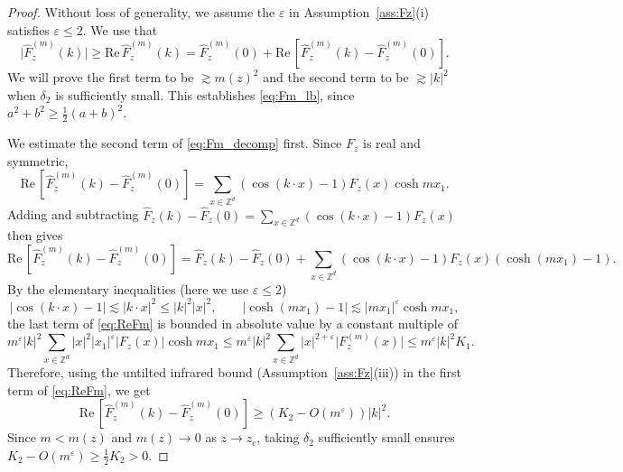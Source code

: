 \documentclass[11pt,hidelinks]{article}
\theoremstyle{plain}
\numberwithin{equation}{section}
\newcommand{\eps}{\varepsilon}
\newcommand{\Z}{\mathbb{Z}}
\renewcommand{\(}{\left(}
\renewcommand{\)}{\right)}
\newcommand{\half}{\frac{1}{2}}
\newcommand{\1}{\mathds{1}}
\renewcommand{\Re}{\mathrm{Re}\,}
\providecommand{\abs}[1]{\lvert#1\rvert}
\newcommand{\mz}{m(z)}
\newcommand{\supm}{^{(m)}}
\begin{document}
\begin{proof}
Without loss of generality, we assume the $\eps$ in Assumption~\ref{ass:Fz}(i) satisfies $\eps \le 2$. 
We use that
\begin{equation}
\label{eq:Fm_decomp}
\abs{ \hat F_z\supm (k) }
\ge \Re \hat F_z\supm (k)
= \hat F_z\supm(0) + \Re [ \hat F_z\supm(k) - \hat F_z\supm (0) ]. 
\end{equation}
We will prove the first term to be $\gtrsim \mz^2$ and the second term to be $\gtrsim \abs k^2$ when $\delta_2$ is sufficiently small. This establishes \eqref{eq:Fm_lb}, since $a^2 + b^2 \ge \half (a + b)^2$. 

We estimate the second term of \eqref{eq:Fm_decomp} first. 
Since $F_z$ is real and symmetric, 
\begin{equation}
\Re [ \hat F_z\supm(k) - \hat F_z\supm (0) ]
=  \sum_{x\in \Z^d} ( \cos (k\cdot x) - 1) F_z(x) \cosh mx_1.
\end{equation}
Adding and subtracting 
$\hat F_z(k) - \hat F_z(0) =  \sum_{x\in \Z^d} ( \cos (k\cdot x) - 1 ) F_z(x)$
then gives
\begin{equation}
\label{eq:ReFm}
\Re [ \hat F_z\supm(k) - \hat F_z\supm (0) ]
= \hat F_z(k) - \hat F_z(0) + \sum_{x\in \Z^d} ( \cos (k\cdot x) - 1 ) F_z(x) (\cosh (mx_1) - 1). 
\end{equation}
By the elementary inequalities (here we use $\eps\le 2$)
\begin{equation}
\label{eq:cosh1}
\abs{  \cos (k\cdot x) - 1 } \lesssim \abs{ k\cdot x }^2 \le \abs k^2 \abs x^2,
\qquad
\abs{ \cosh (mx_1) - 1 } \lesssim \abs{ mx_1}^\eps \cosh mx_1, 
\end{equation}
the last term of \eqref{eq:ReFm} is bounded in absolute value by a constant multiple of
\begin{equation}
m^\eps \abs k^2 \sum_{x\in \Z^d} \abs x^2 \abs{ x_1}^\eps \abs {F_z(x) } \cosh mx_1
\le m^\eps \abs k^2 \sum_{x\in \Z^d} \abs x^{2+\eps} \abs {F_z\supm(x) }
\le m^\eps \abs k^2 K_1.
\end{equation}
Therefore, using the untilted infrared bound (Assumption~\ref{ass:Fz}(iii)) in the first term of \eqref{eq:ReFm}, we get
\begin{equation}
\Re [ \hat F_z\supm(k) - \hat F_z\supm (0) ]
\ge (K_2 - O(m^\eps) ) \abs k^2.
\end{equation}
Since $m < \mz$ and $\mz \to 0$ as $z\to z_c$, taking $\delta_2$ sufficiently small ensures $K_2 - O(m^\eps) \ge \half K_2 > 0$. 


\end{proof}
\end{document}
